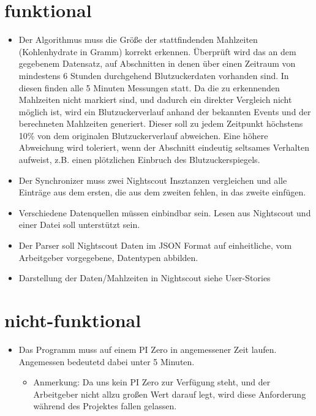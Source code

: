 \documentclass[accentcolor=tud0b,12pt,paper=a4]{tudreport}
\begin{document}
	\section{funktional}
\begin{itemize}
	\item Der Algorithmus muss die Größe der stattfindenden Mahlzeiten (Kohlenhydrate in Gramm) korrekt erkennen. 
	 Überprüft wird das an dem gegebenem Datensatz, auf Abschnitten in denen über einen Zeitraum von mindestens 6 Stunden durchgehend Blutzuckerdaten vorhanden sind. In diesen finden alle 5 Minuten Messungen statt. Da die zu erkennenden Mahlzeiten nicht markiert sind, und dadurch ein direkter Vergleich nicht möglich ist, wird ein Blutzuckerverlauf anhand der bekannten Events und der berechneten Mahlzeiten generiert. Dieser soll zu jedem Zeitpunkt höchstens 10\% von dem originalen Blutzuckerverlauf abweichen. Eine höhere Abweichung wird toleriert, wenn der Abschnitt eindeutig seltsames Verhalten aufweist, z.B. einen plötzlichen Einbruch des Blutzuckerspiegels.
	
\item Der Synchronizer muss zwei Nightscout Insztanzen vergleichen und alle Einträge aus dem ersten, die aus dem zweiten fehlen, in das zweite einfügen.

\item Verschiedene Datenquellen müssen einbindbar sein. Lesen aus Nightscout und einer Datei soll unterstützt sein.

\item Der Parser soll Nightscout Daten im JSON Format auf einheitliche, vom Arbeitgeber vorgegebene, Datentypen abbilden.


\item Darstellung der Daten/Mahlzeiten in Nightscout siehe User-Stories

\end{itemize}

	
	\section{nicht-funktional}
\begin{itemize}
	\item Das Programm muss auf einem PI Zero in angemessener Zeit laufen. Angemessen bedeutetd dabei unter 5 Minuten. 
	\begin{itemize}
	\item Anmerkung: Da uns kein PI Zero zur Verfügung steht, und der Arbeitgeber nicht allzu großen Wert darauf legt, wird diese Anforderung während des Projektes fallen gelassen. 
	\end{itemize}
	
\end{itemize}
\end{document}
